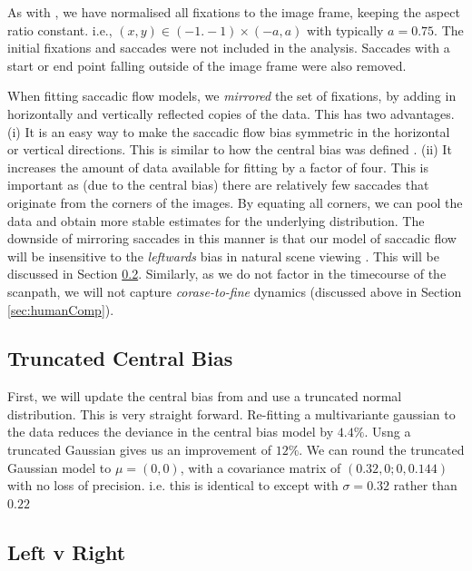 \documentclass[a4paper, twocolumn, oneside, 10pt]{article}
\begin{document}
As with \cite{clarke-tatler2014}, we have normalised all fixations to the image frame, keeping the aspect ratio constant. i.e., $(x,y)\in (-1.-1)\times(-a,a)$ with typically $a=0.75$. The initial fixations and saccades were not included in the analysis. Saccades with a start or end point falling outside of the image frame were also removed. 

When fitting saccadic flow models, we \textit{mirrored} the set of fixations, by adding in horizontally and vertically reflected copies of the data. This has two advantages. (i) It is an easy way to make the saccadic flow bias symmetric in the horizontal or vertical directions. This is similar to how the central bias was defined \cite{clarke-tatler2014}. (ii) It increases the amount of data available for fitting by a factor of four. This is important as (due to the central bias) there are relatively few saccades that originate from the corners of the images. By equating all corners, we can pool the data and obtain more stable estimates for the underlying distribution. The downside of mirroring saccades in this manner is that our model of saccadic flow will be insensitive to the \textit{leftwards} bias in natural scene viewing \citep{nuthmann-matthias2014}. This will be discussed in Section \ref{sec:LeftRight}. Similarly, as we do not factor in the timecourse of the scanpath, we will not capture \textit{corase-to-fine} dynamics (discussed above in Section \ref{sec:humanComp}).


\subsection{Truncated Central Bias}
\label{sec:truncatedCentral}

First, we will update the central bias from \cite{clarke-tatler2014} and use a truncated normal distribution. This is very straight forward. Re-fitting a multivariante gaussian to the data reduces the deviance in the central bias model by $4.4\%$. Usng a truncated Gaussian gives us an improvement of $12\%$. We can round the truncated Gaussian model to $\mu = (0,0)$, with a covariance matrix of $(0.32, 0; 0, 0.144)$ with no loss of precision. i.e. this is identical to \cite{clarke-tatler2014} except with $\sigma=0.32$ rather than $0.22$

\subsection{Left v Right}
\label{sec:LeftRight}
\end{document}

